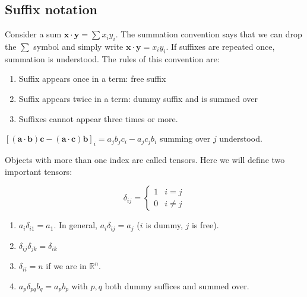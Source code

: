 \documentclass[a4paper]{article}
\begin{document}
\subsection{Suffix notation}
\begin{notation}
  Consider a sum $\mathbf{x}\cdot \mathbf{y} = \sum x_i y_i$. The summation convention says that we can drop the $\sum$ symbol and simply write $\mathbf{x}\cdot \mathbf{y} = x_i y_i$. If suffixes are repeated once, summation is understood. The rules of this convention are:
  \begin{enumerate}
    \item Suffix appears once in a term: free suffix
    \item Suffix appears twice in a term: dummy suffix and is summed over
    \item Suffixes cannot appear three times or more.
  \end{enumerate}
\end{notation}

\begin{eg}
  $[\mathbf{(a\cdot b)c - (a \cdot c)b}]_i = a_jb_jc_i - a_jc_jb_i$ summing over $j$ understood.
\end{eg}
Objects with more than one index are called tensors. Here we will define two important tensors:
\begin{defi}\leavevmode
\begin{equation}
    \delta_{ij} =
    \begin{cases}
      1 & i = j\\
      0 & i\not=j
    \end{cases}\tag{1.4}
\end{equation}
\end{defi}

\begin{eg}\leavevmode
  \begin{enumerate}
    \item $a_i\delta_{i1} = a_1$. In general, $a_i\delta_{ij} = a_j$ ($i$ is dummy, $j$ is free).
    \item $\delta_{ij}\delta_{jk} = \delta_{ik}$
    \item $\delta_{ii} = n$ if we are in $\mathbb{R}^n$.
    \item $a_p\delta_{pq}b_q = a_pb_p$ with $p, q$ both dummy suffices and summed over.
  \end{enumerate}
\end{eg}
\end{document}
